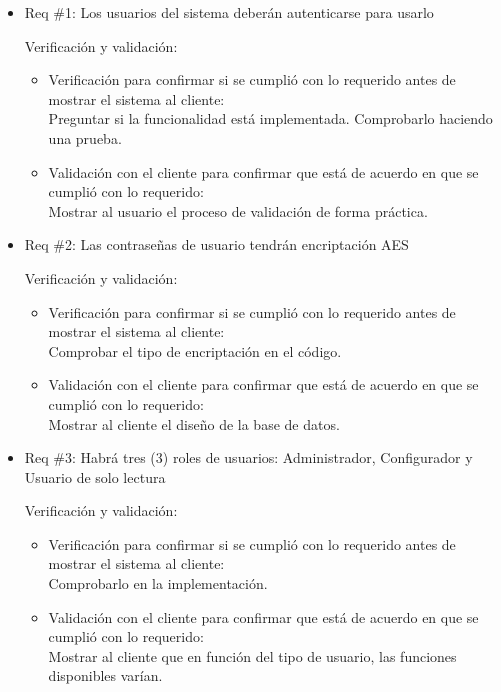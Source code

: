 \documentclass[11pt]{charter}
\begin{document}
\begin{itemize}
\item Req \#1: Los usuarios del sistema deberán autenticarse para usarlo

Verificación y validación:

\begin{itemize}
\item Verificación para confirmar si se cumplió con lo requerido antes de mostrar el sistema al cliente:\\
Preguntar si la funcionalidad está implementada. Comprobarlo haciendo una prueba.
\item Validación con el cliente para confirmar que está de acuerdo en que se cumplió con lo requerido:\\
Mostrar al usuario el proceso de validación de forma práctica. 
\end{itemize}

\item Req \#2: Las contraseñas de usuario tendrán encriptación AES

Verificación y validación:

\begin{itemize}
\item Verificación para confirmar si se cumplió con lo requerido antes de mostrar el sistema al cliente:\\
Comprobar el tipo de encriptación en el código. 
\item Validación con el cliente para confirmar que está de acuerdo en que se cumplió con lo requerido:\\
Mostrar al cliente el diseño de la base de datos.
\end{itemize}

\item Req \#3: Habrá tres (3) roles de usuarios: Administrador, Configurador y Usuario de solo lectura

Verificación y validación:

\begin{itemize}
\item Verificación para confirmar si se cumplió con lo requerido antes de mostrar el sistema al cliente:\\
Comprobarlo en la implementación. 
\item Validación con el cliente para confirmar que está de acuerdo en que se cumplió con lo requerido:\\
Mostrar al cliente que en función del tipo de usuario, las funciones disponibles varían.
\end{itemize}


\end{itemize}
\end{document}
